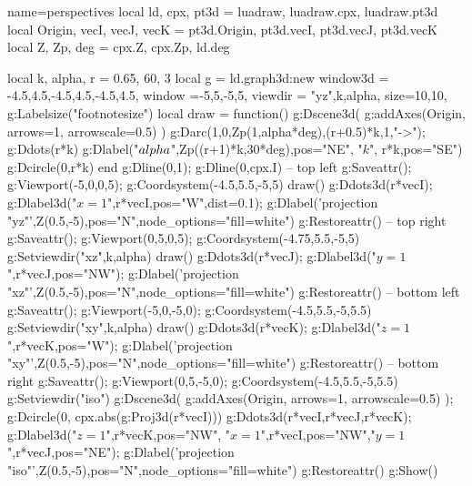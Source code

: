 \begin{center}
\begin{luadraw}{name=perspectives}
local ld, cpx, pt3d = luadraw, luadraw.cpx, luadraw.pt3d
local Origin, vecI, vecJ, vecK = pt3d.Origin, pt3d.vecI, pt3d.vecJ, pt3d.vecK 
local Z, Zp, deg = cpx.Z, cpx.Zp, ld.deg

local k, alpha, r = 0.65, 60, 3
local g = ld.graph3d:new{
    window3d = {-4.5,4.5,-4.5,4.5,-4.5,4.5},
    window ={-5,5,-5,5},
    viewdir = {"yz",k,alpha},
    size={10,10},
}
g:Labelsize("footnotesize")
local draw = function()
    g:Dscene3d( g:addAxes(Origin, {arrows=1, arrowscale=0.5}) )
    g:Darc(1,0,Zp(1,alpha*deg),(r+0.5)*k,1,"->"); g:Ddots(r*k)
    g:Dlabel("$\\alpha$",Zp((r+1)*k,30*deg),{pos="NE"}, "$k$", r*k,{pos="SE"})
    g:Dcircle(0,r*k)
end
g:Dline(0,1); g:Dline(0,cpx.I)
-- top left
g:Saveattr(); g:Viewport(-5,0,0,5); g:Coordsystem(-4.5,5.5,-5,5)
draw()
g:Ddots3d(r*vecI); g:Dlabel3d("$x=1$",r*vecI,{pos="W",dist=0.1}); 
g:Dlabel('projection "yz"',Z(0.5,-5),{pos="N",node_options="fill=white"})
g:Restoreattr()
-- top right
g:Saveattr(); g:Viewport(0,5,0,5); g:Coordsystem(-4.75,5.5,-5,5)
g:Setviewdir({"xz",k,alpha})
draw()
g:Ddots3d(r*vecJ); g:Dlabel3d("$y=1$",r*vecJ,{pos="NW"}); 
g:Dlabel('projection "xz"',Z(0.5,-5),{pos="N",node_options="fill=white"})
g:Restoreattr()
-- bottom left
g:Saveattr(); g:Viewport(-5,0,-5,0); g:Coordsystem(-4.5,5.5,-5,5.5)
g:Setviewdir({"xy",k,alpha})
draw()
g:Ddots3d(r*vecK); g:Dlabel3d("$z=1$",r*vecK,{pos="W"}); 
g:Dlabel('projection "xy"',Z(0.5,-5),{pos="N",node_options="fill=white"})
g:Restoreattr()
-- bottom right
g:Saveattr(); g:Viewport(0,5,-5,0); g:Coordsystem(-4.5,5.5,-5,5.5)
g:Setviewdir("iso")
g:Dscene3d( g:addAxes(Origin, {arrows=1, arrowscale=0.5}) ); g:Dcircle(0, cpx.abs(g:Proj3d(r*vecI)))
g:Ddots3d({r*vecI,r*vecJ,r*vecK}); 
g:Dlabel3d("$z=1$",r*vecK,{pos="NW"}, "$x=1$",r*vecI,{pos="NW"},"$y=1$",r*vecJ,{pos="NE"});
g:Dlabel('projection "iso"',Z(0.5,-5),{pos="N",node_options="fill=white"})
g:Restoreattr()
g:Show()
\end{luadraw}
\end{center}



